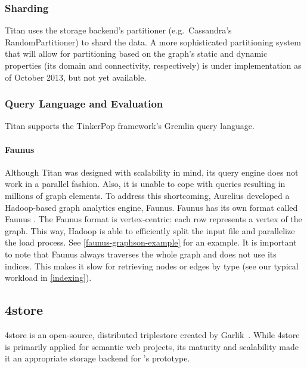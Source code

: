 \subsubsection{Sharding}

Titan uses the storage backend's partitioner (e.g.\ Cassandra's RandomPartitioner) to shard the data. A more sophisticated partitioning system that will allow for partitioning based on the graph's static and dynamic properties (its domain and connectivity, respectively) is under implementation as of October 2013, but not yet available.

\subsubsection{Query Language and Evaluation}

Titan supports the TinkerPop framework's Gremlin query language.



\paragraph{Faunus}

Although Titan was designed with scalability in mind, its query engine does not work in a parallel fashion. Also, it is unable to cope with queries resulting in millions of graph elements. To address this shortcoming, Aurelius developed a Hadoop-based graph analytics engine, Faunus. Faunus has its own format called Faunus \graphson{}. The Faunus \graphson{} format is vertex-centric: each row represents a vertex of the graph. This way, Hadoop is able to efficiently split the input file and parallelize the load process. See \autoref{faunus-graphson-example} for an example. It is important to note that Faunus always traverses the whole graph and does not use its indices. This makes it slow for retrieving nodes or edges by type (see our typical workload in \autoref{indexing}).






\subsection{4store}
\label{4store}

4store is an open-source, distributed triplestore created by Garlik~\cite{4store}. While 4store is primarily applied for semantic web projects, its maturity and scalability made it an appropriate storage backend for \iqd{}'s prototype.

